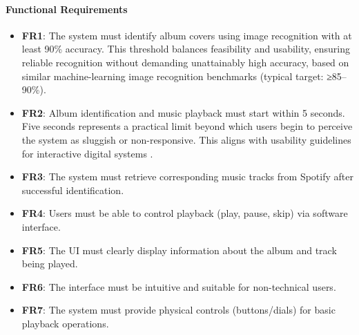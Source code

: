             \paragraph{Functional Requirements}
                \begin{itemize}
                    \item \textbf{FR1}: The system must identify album covers using image recognition with at least 90\% accuracy. This threshold balances feasibility and usability, ensuring reliable recognition without demanding unattainably high accuracy, based on similar machine-learning image recognition benchmarks (typical target: ≥85–90\%).
                    \item \textbf{FR2}: Album identification and music playback must start within 5 seconds. Five seconds represents a practical limit beyond which users begin to perceive the system as sluggish or non-responsive. This aligns with usability guidelines for interactive digital systems \cite{nngroupResponseTimes}.
                    \item \textbf{FR3}: The system must retrieve corresponding music tracks from Spotify after successful identification.
                    \item \textbf{FR4}: Users must be able to control playback (play, pause, skip) via software interface.
                    \item \textbf{FR5}: The UI must clearly display information about the album and track being played.
                    \item \textbf{FR6}: The interface must be intuitive and suitable for non-technical users.
                    \item \textbf{FR7}: The system must provide physical controls (buttons/dials) for basic playback operations.
                \end{itemize}
            
